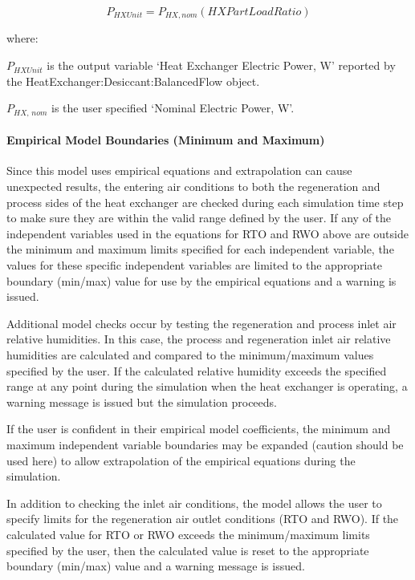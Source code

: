 \begin{equation}
{P_{HXUnit}} = {P_{HX,nom}}\left( {HXPartLoadRatio} \right)
\end{equation}

where:

\({P_{HXUnit}}\) is the output variable `Heat Exchanger Electric Power, W' reported by the HeatExchanger:Desiccant:BalancedFlow object.

\({P_{HX,\,nom}}\) is the user specified `Nominal Electric Power, W'.

\paragraph{Empirical Model Boundaries (Minimum and Maximum)}\label{empirical-model-boundaries-minimum-and-maximum}

Since this model uses empirical equations and extrapolation can cause unexpected results, the entering air conditions to both the regeneration and process sides of the heat exchanger are checked during each simulation time step to make sure they are within the valid range defined by the user. If any of the independent variables used in the equations for RTO and RWO above are outside the minimum and maximum limits specified for each independent variable, the values for these specific independent variables are limited to the appropriate boundary (min/max) value for use by the empirical equations and a warning is issued.

Additional model checks occur by testing the regeneration and process inlet air relative humidities. In this case, the process and regeneration inlet air relative humidities are calculated and compared to the minimum/maximum values specified by the user. If the calculated relative humidity exceeds the specified range at any point during the simulation when the heat exchanger is operating, a warning message is issued but the simulation proceeds.

If the user is confident in their empirical model coefficients, the minimum and maximum independent variable boundaries may be expanded (caution should be used here) to allow extrapolation of the empirical equations during the simulation.

In addition to checking the inlet air conditions, the model allows the user to specify limits for the regeneration air outlet conditions (RTO and RWO). If the calculated value for RTO or RWO exceeds the minimum/maximum limits specified by the user, then the calculated value is reset to the appropriate boundary (min/max) value and a warning message is issued.

